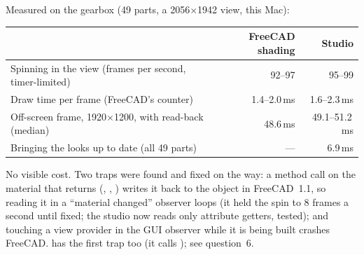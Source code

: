 Measured on the gearbox (49 parts, a 2056$\times$1942 view, this Mac):
\begin{center}
\small
\begin{tabular}{@{}lrr@{}}
\toprule
 & FreeCAD shading & Studio\\
\midrule
Spinning in the view (frames per second, timer-limited) & 92--97 & 95--99\\
Draw time per frame (FreeCAD's counter) & 1.4--2.0\,ms & 1.6--2.3\,ms\\
Off-screen frame, 1920$\times$1200, with read-back (median) & 48.6\,ms & 49.1--51.2\,ms\\
Bringing the looks up to date (all 49 parts) & --- & 6.9\,ms\\
\bottomrule
\end{tabular}
\end{center}
No visible cost. Two traps were found and fixed on the way: a method call on the material that
 returns (, , )
writes it back to the object in FreeCAD~1.1, so reading it in a ``material changed'' observer loops (it held the
spin to 8 frames a second until fixed; the studio now reads only attribute getters, tested); and touching a view
provider in the GUI observer while it is being built crashes FreeCAD.  has the first
trap too (it calls ); see question~6.

